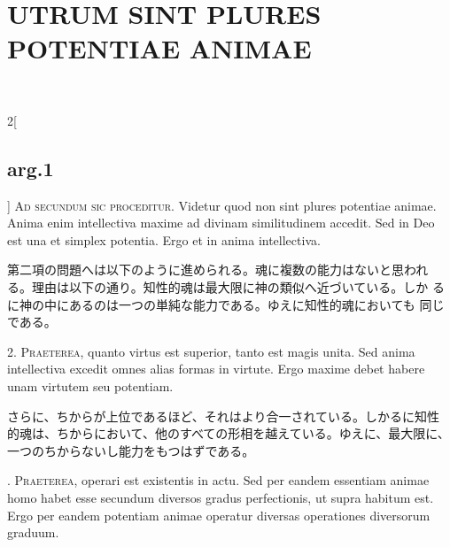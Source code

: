 \documentclass[paper=a4paper,fontsize=10pt,jafontsize=9pt,titlepage]{jlreq}
\begin{document}
\newpage

\section{UTRUM SINT PLURES POTENTIAE ANIMAE}
\vspace{1em}
\\
\vspace{1em}

\begin{paracol}{2}[\subsection{arg.1}]
 {\scshape Ad secundum sic proceditur}. Videtur quod non sint plures
 potentiae animae. Anima enim intellectiva maxime ad divinam
 similitudinem accedit. Sed in Deo est una et simplex potentia. Ergo
 et in anima intellectiva.

 \switchcolumn

 第二項の問題へは以下のように進められる。魂に複数の能力はないと思われ
 る。理由は以下の通り。知性的魂は最大限に神の類似へ近づいている。しか
 るに神の中にあるのは一つの単純な能力である。ゆえに知性的魂においても
 同じである。


2. {\scshape Praeterea}, quanto virtus est superior, tanto est magis
unita. Sed anima intellectiva excedit omnes alias formas in
virtute. Ergo maxime debet habere unam virtutem seu potentiam.

 \switchcolumn

さらに、ちからが上位であるほど、それはより合一されている。しかるに知性
的魂は、ちからにおいて、他のすべての形相を越えている。ゆえに、最大限に、
一つのちからないし能力をもつはずである。

. {\scshape Praeterea}, operari est existentis in actu. Sed per
eandem essentiam animae homo habet esse secundum diversos gradus
perfectionis, ut supra habitum est. Ergo per eandem potentiam animae
operatur diversas operationes diversorum graduum.

 \switchcolumn


\end{paracol}
\end{document}
